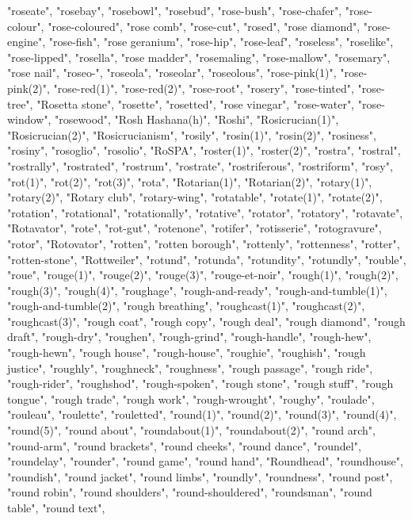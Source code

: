 "roseate",
"rosebay",
"rosebowl",
"rosebud",
"rose-bush",
"rose-chafer",
"rose-colour",
"rose-coloured",
"rose comb",
"rose-cut",
"rosed",
"rose diamond",
"rose-engine",
"rose-fish",
"rose geranium",
"rose-hip",
"rose-leaf",
"roseless",
"roselike",
"rose-lipped",
"rosella",
"rose madder",
"rosemaling",
"rose-mallow",
"rosemary",
"rose nail",
"roseo-",
"roseola",
"roseolar",
"roseolous",
"rose-pink(1)",
"rose-pink(2)",
"rose-red(1)",
"rose-red(2)",
"rose-root",
"rosery",
"rose-tinted",
"rose-tree",
"Rosetta stone",
"rosette",
"rosetted",
"rose vinegar",
"rose-water",
"rose-window",
"rosewood",
"Rosh Hashana(h)",
"Roshi",
"Rosicrucian(1)",
"Rosicrucian(2)",
"Rosicrucianism",
"rosily",
"rosin(1)",
"rosin(2)",
"rosiness",
"rosiny",
"rosoglio",
"rosolio",
"RoSPA",
"roster(1)",
"roster(2)",
"rostra",
"rostral",
"rostrally",
"rostrated",
"rostrum",
"rostrate",
"rostriferous",
"rostriform",
"rosy",
"rot(1)",
"rot(2)",
"rot(3)",
"rota",
"Rotarian(1)",
"Rotarian(2)",
"rotary(1)",
"rotary(2)",
"Rotary club",
"rotary-wing",
"rotatable",
"rotate(1)",
"rotate(2)",
"rotation",
"rotational",
"rotationally",
"rotative",
"rotator",
"rotatory",
"rotavate",
"Rotavator",
"rote",
"rot-gut",
"rotenone",
"rotifer",
"rotisserie",
"rotogravure",
"rotor",
"Rotovator",
"rotten",
"rotten borough",
"rottenly",
"rottenness",
"rotter",
"rotten-stone",
"Rottweiler",
"rotund",
"rotunda",
"rotundity",
"rotundly",
"rouble",
"roue",
"rouge(1)",
"rouge(2)",
"rouge(3)",
"rouge-et-noir",
"rough(1)",
"rough(2)",
"rough(3)",
"rough(4)",
"roughage",
"rough-and-ready",
"rough-and-tumble(1)",
"rough-and-tumble(2)",
"rough breathing",
"roughcast(1)",
"roughcast(2)",
"roughcast(3)",
"rough coat",
"rough copy",
"rough deal",
"rough diamond",
"rough draft",
"rough-dry",
"roughen",
"rough-grind",
"rough-handle",
"rough-hew",
"rough-hewn",
"rough house",
"rough-house",
"roughie",
"roughish",
"rough justice",
"roughly",
"roughneck",
"roughness",
"rough passage",
"rough ride",
"rough-rider",
"roughshod",
"rough-spoken",
"rough stone",
"rough stuff",
"rough tongue",
"rough trade",
"rough work",
"rough-wrought",
"roughy",
"roulade",
"rouleau",
"roulette",
"rouletted",
"round(1)",
"round(2)",
"round(3)",
"round(4)",
"round(5)",
"round about",
"roundabout(1)",
"roundabout(2)",
"round arch",
"round-arm",
"round brackets",
"round cheeks",
"round dance",
"roundel",
"roundelay",
"rounder",
"round game",
"round hand",
"Roundhead",
"roundhouse",
"roundish",
"round jacket",
"round limbs",
"roundly",
"roundness",
"round post",
"round robin",
"round shoulders",
"round-shouldered",
"roundsman",
"round table",
"round text",

